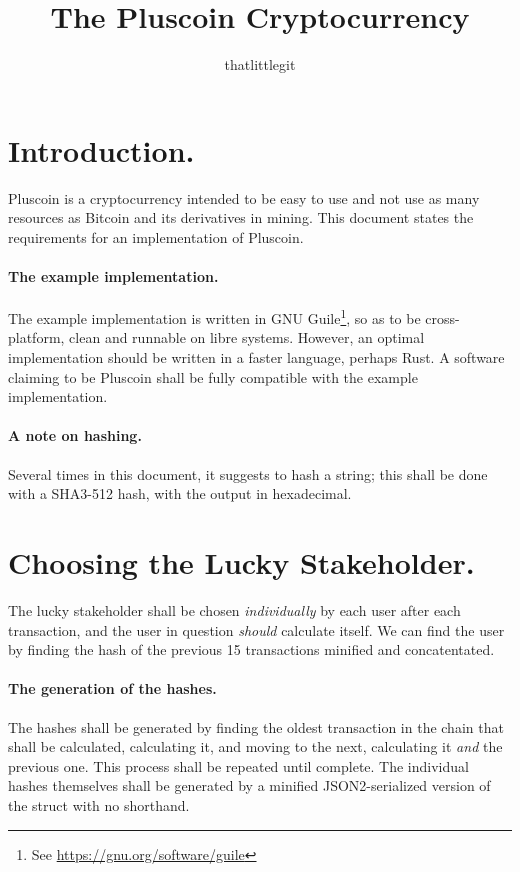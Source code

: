 \documentclass{article}
\title{The Pluscoin Cryptocurrency}
\author{thatlittlegit}
\date{}
\begin{document}
\maketitle
\tableofcontents
\newpage
{}

\section{Introduction.}
Pluscoin is a cryptocurrency intended to be easy to use and not use as many
resources as Bitcoin and its derivatives in mining. This document states the
requirements for an implementation of Pluscoin.

\paragraph{The example implementation.} The example implementation is written
in GNU Guile\footnote{See \url{https://gnu.org/software/guile}}, so as to be
cross-platform, clean and runnable on libre systems. However, an optimal
implementation should be written in a faster language, perhaps Rust. A software
claiming to be Pluscoin shall be fully compatible with the example
implementation.

\paragraph{A note on hashing.} Several times in this document, it suggests to
hash a string; this shall be done with a SHA3-512 hash, with the output in
hexadecimal.

\section{Choosing the Lucky Stakeholder.}
The lucky stakeholder shall be chosen {\it{individually}} by each user after
each transaction, and the user in question {\it{should}} calculate itself. We
can find the user by finding the hash of the previous 15 transactions
minified and concatentated.

\paragraph{The generation of the hashes.} The hashes shall be generated
by finding the oldest transaction in the chain that shall be calculated,
calculating it, and moving to the next, calculating it {\it{and}} the previous
one. This process shall be repeated until complete. The individual hashes
themselves shall be generated by a minified JSON2-serialized version of the
struct with no shorthand.
\end{document}
